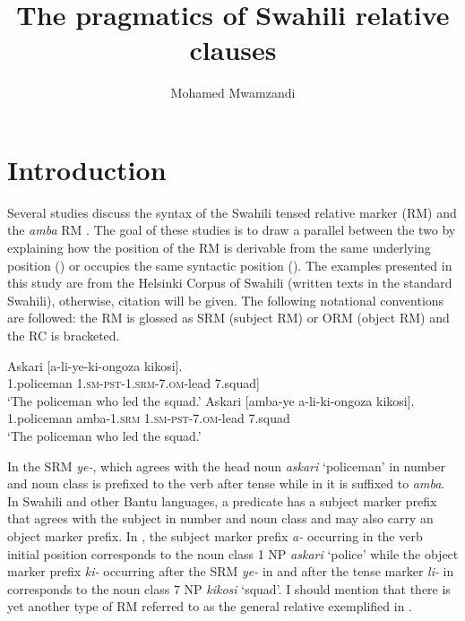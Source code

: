 \documentclass[output=paper,colorlinks,citecolor=brown]{langscibook}
\author{Mohamed Mwamzandi\affiliation{University of North Carolina at Chapel Hill}}
\title{The pragmatics of Swahili relative clauses}
\begin{document}
\maketitle 

\section{Introduction}\label{sec:mwamzandi:1}

Several studies discuss the syntax of the Swahili tensed relative marker (RM)  and the \textit{amba} RM . The goal of these studies is to draw a parallel between the two by explaining how the position of the RM is derivable from the same underlying position (\citealt{Vitale1981, Keach1985}) or occupies the same syntactic position (\citealt{DemuthHarford1999, Ngonyani2001, Ngonyani2006}). The examples presented in this study are from the Helsinki Corpus of Swahili (written texts in the standard Swahili), otherwise, citation will be given. The following notational conventions are followed: the RM is glossed as SRM (subject RM) or ORM (object RM) and the RC is bracketed.

\ea%
    \label{ex:mwamzandi:1}
    \gll    Askari [a-li-ye-ki-ongoza kikosi].\\
            1.policeman  \textsc{1.sm-pst-1.srm-7.om-}lead  7.squad]\\
    \glt    ‘The policeman who led the squad.’
\ex%
    \label{ex:mwamzandi:2}
    \gll    Askari [amba-ye a-li-ki-ongoza kikosi].\\
            1.policeman  amba\textsc{-1.srm}  \textsc{1.sm-pst-7.om-}lead  7.squad\\
    \glt    ‘The policeman who led the squad.’
\z

In  the SRM \textit{ye-}, which agrees with the head noun \textit{askari} ‘policeman’ in number and noun class is prefixed to the verb after tense while in  it is suffixed to \textit{amba}. In Swahili and other Bantu languages, a predicate has a subject marker prefix that agrees with the subject in number and noun class and may also carry an object marker prefix. In , the subject marker prefix \textit{a-} occurring in the verb initial position corresponds to the noun class 1 NP \textit{askari} ‘police’ while the object marker prefix \textit{ki-} occurring after the SRM \textit{ye-} in  and after the tense marker \textit{li-} in  corresponds to the noun class 7 NP \textit{kikosi} ‘squad’. I should mention that there is yet another type of RM referred to as the general relative exemplified in .
\end{document}
